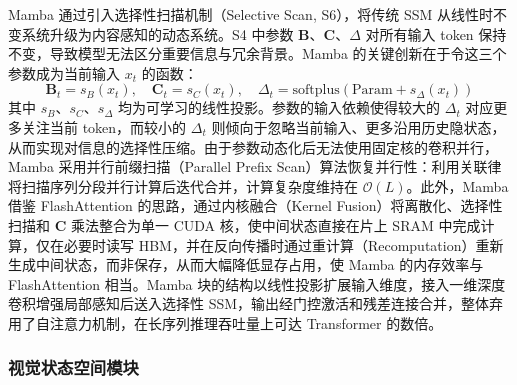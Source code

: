\documentclass[12pt, a4paper, twoside]{article}
\begin{document}
Mamba 通过引入选择性扫描机制（Selective Scan, S6），将传统 SSM 从线性时不变系统升级为内容感知的动态系统。S4 中参数 $\mathbf{B}$、$\mathbf{C}$、$\Delta$ 对所有输入 token 保持不变，导致模型无法区分重要信息与冗余背景。Mamba 的关键创新在于令这三个参数成为当前输入 $x_t$ 的函数：
\begin{equation}
\mathbf{B}_t = s_B(x_t), \quad \mathbf{C}_t = s_C(x_t), \quad
\Delta_t = \text{softplus}\!\left(\text{Param} + s_\Delta(x_t)\right)
\end{equation}
其中 $s_B$、$s_C$、$s_\Delta$ 均为可学习的线性投影。参数的输入依赖使得较大的 $\Delta_t$ 对应更多关注当前 token，而较小的 $\Delta_t$ 则倾向于忽略当前输入、更多沿用历史隐状态，从而实现对信息的选择性压缩。由于参数动态化后无法使用固定核的卷积并行，Mamba 采用并行前缀扫描（Parallel Prefix Scan）算法恢复并行性：利用关联律将扫描序列分段并行计算后迭代合并，计算复杂度维持在 $\mathcal{O}(L)$。此外，Mamba 借鉴 FlashAttention 的思路，通过内核融合（Kernel Fusion）将离散化、选择性扫描和 $\mathbf{C}$ 乘法整合为单一 CUDA 核，使中间状态直接在片上 SRAM 中完成计算，仅在必要时读写 HBM，并在反向传播时通过重计算（Recomputation）重新生成中间状态，而非保存，从而大幅降低显存占用，使 Mamba 的内存效率与 FlashAttention 相当。Mamba 块的结构以线性投影扩展输入维度，接入一维深度卷积增强局部感知后送入选择性 SSM，输出经门控激活和残差连接合并，整体弃用了自注意力机制，在长序列推理吞吐量上可达 Transformer 的数倍。

\subsubsection{视觉状态空间模块}
\end{document}
